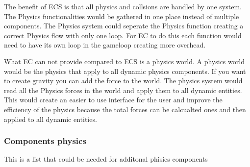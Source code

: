 \documentclass{projdoc}
\begin{document}
The benefit of ECS is that all physics and collsions are handled by one system. The
Physics functionalities would be gathered in one place instead of multiple
components. The Physics system could seperate the Physics function creating a correct
Physics flow with only one loop. For EC to do this each function would need to have
its own loop in the gameloop creating more overhead.

What EC can not provide compared to ECS is a physics world. A physics world would be
the physics that apply to all dynamic physics components. If you want to create
gravity you can add the force to the world. The physics system would read all the
Physics forces in the world and apply them to all dynamic entities. This would create
an easier to use interface for the user and improve the efficiency of the physics
because the total forces can be calcualted ones and then applied to all dynamic
entities.

\subsubsection{Components physics}

This is a list that could be needed for additonal phisics components
\end{document}
